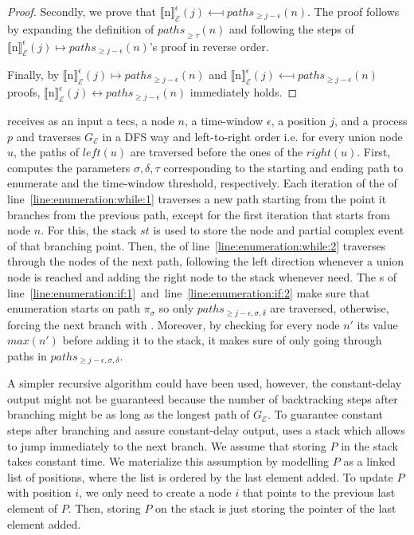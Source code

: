 \begin{proof}
  Secondly, we prove that ${\llbracket \text{n} \rrbracket}^{\epsilon}_{\mathcal{E}}(j) \longmapsfrom paths_{\ge j - \epsilon}(n)$. The proof follows by expanding the definition of ${paths}_{\ge \tau}(n)$ and following the steps of ${\llbracket \text{n} \rrbracket}^{\epsilon}_{\mathcal{E}}(j) \longmapsto paths_{\ge j - \epsilon}(n)$'s proof in reverse order.

  Finally, by ${\llbracket \text{n} \rrbracket}^{\epsilon}_{\mathcal{E}}(j) \longmapsto paths_{\ge j - \epsilon}(n)$ and ${\llbracket \text{n} \rrbracket}^{\epsilon}_{\mathcal{E}}(j) \longmapsfrom paths_{\ge j - \epsilon}(n)$ proofs, ${\llbracket \text{n} \rrbracket}^{\epsilon}_{\mathcal{E}}(j) \longleftrightarrow paths_{\ge j - \epsilon}(n)$ immediately holds.

\end{proof}

 receives as an input a \acrshort{tecs}, a node $n$, a time-window $\epsilon$, a position $j$, and a process $p$ and traverses $G_{\mathcal{E}}$ in a DFS way and left-to-right order i.e. for every union node $u$, the paths of $left(u)$ are traversed before the ones of the $right(u)$. First, computes the parameters $\sigma, \delta, \tau$ corresponding to the starting and ending path to enumerate and the time-window threshold, respectively. Each iteration of the  of line~\ref{line:enumeration:while:1} traverses a new path starting from the point it branches from the previous path, except for the first iteration that starts from node $n$. For this, the stack $st$ is used to store the node and partial complex event of that branching point. Then, the  of line~\ref{line:enumeration:while:2} traverses through the nodes of the next path, following the left direction whenever a union node is reached and adding the right node to the stack whenever need. The s of line~\ref{line:enumeration:if:1}~and~line~\ref{line:enumeration:if:2} make sure that enumeration starts on path $\pi_{\sigma}$ so only $paths_{\ge j - \epsilon, \sigma, \delta}$ are traversed, otherwise, forcing the next branch with . Moreover, by checking for every node $n'$ its value $max(n')$ before adding it to the stack, it makes sure of only going through paths in $paths_{\ge j - \epsilon, \sigma, \delta}$.

A simpler recursive algorithm could have been used, however, the constant-delay output might not be guaranteed because the number of backtracking steps after branching might be as long as the longest path of $G_{\mathcal{E}}$. To guarantee constant steps after branching and assure constant-delay output,  uses a stack which allows to jump immediately to the next branch. We assume that storing $P$ in the stack takes constant time. We materialize this assumption by modelling $P$ as a linked list of positions, where the list is ordered by the last element added. To update $P$ with position $i$, we only need to create a node $i$ that points to the previous last element of $P$. Then, storing $P$ on the stack is just storing the pointer of the last element added.


